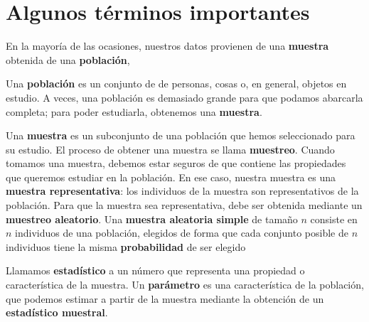 \documentclass[
  letterpaper,
]{scrbook}
\begin{document}
\hypertarget{algunos-tuxe9rminos-importantes}{%
\section{Algunos términos
importantes}\label{algunos-tuxe9rminos-importantes}}

En la mayoría de las ocasiones, nuestros datos provienen de una
\textbf{muestra} obtenida de una \textbf{población},

{}

Una \textbf{población} es un conjunto de de personas, cosas o, en
general, objetos en estudio. A veces, una población es demasiado grande
para que podamos abarcarla completa; para poder estudiarla, obtenemos
una \textbf{muestra}.


Una \textbf{muestra} es un subconjunto de una población que hemos
seleccionado para su estudio. El proceso de obtener una muestra se llama
\textbf{muestreo}. Cuando tomamos una muestra, debemos estar seguros de
que contiene las propiedades que queremos estudiar en la población. En
ese caso, nuestra muestra es una \textbf{muestra representativa}: los
individuos de la muestra son representativos de la población. Para que
la muestra sea representativa, debe ser obtenida mediante un
\textbf{muestreo aleatorio}. Una \textbf{muestra aleatoria simple} de
tamaño \(n\) consiste en \(n\) individuos de una población, elegidos de
forma que cada conjunto posible de \(n\) individuos tiene la misma
\textbf{probabilidad} de ser elegido


{}

Llamamos \textbf{estadístico} a un número que representa una propiedad o
característica de la muestra. Un \textbf{parámetro} es una
característica de la población, que podemos estimar a partir de la
muestra mediante la obtención de un \textbf{estadístico muestral}.

{}
\end{document}
